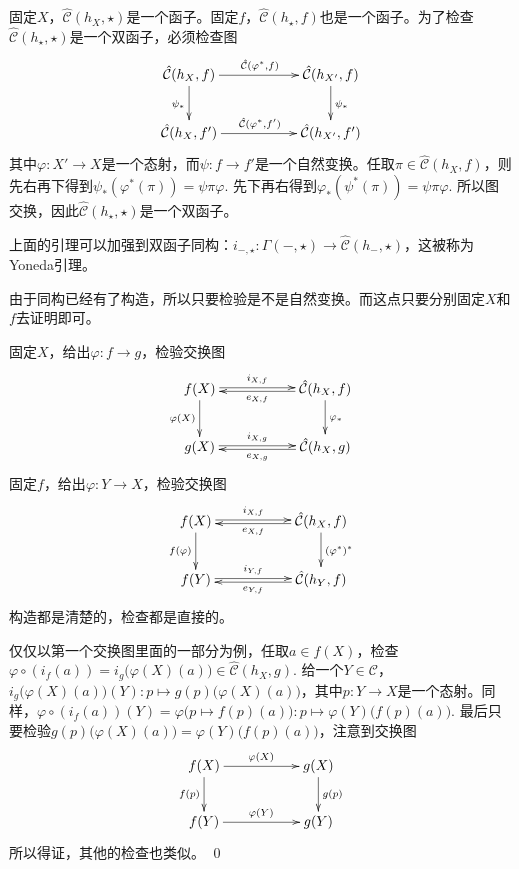 

\para 固定$X$，${\hat{\mathcal{C}}}(h_X,\star)$是一个函子。固定$f$，${\hat{\mathcal{C}}}(h_\star,f)$也是一个函子。为了检查${\hat{\mathcal{C}}}(h_\star,\star)$是一个双函子，必须检查图
\[
\begin{xy}
	\xymatrix{
		\hat{\mathcal{C}}(h_{X},f)\ar[rr]^{\hat{\mathcal{C}}(\varphi^*,f)} \ar[d]_{\psi_*}&&\hat{\mathcal{C}}(h_{X'},f) \ar[d]^{\psi_*}\\
		\hat{\mathcal{C}}(h_{X},f')\ar[rr]^{\hat{\mathcal{C}}(\varphi^*,f')}&&\hat{\mathcal{C}}(h_{X'},f')
	}
\end{xy}
\]
其中$\varphi:X'\to X$是一个态射，而$\psi:f\to f'$是一个自然变换。任取$\pi\in \hat{\mathcal{C}}(h_{X},f)$，则先右再下得到$\psi_*(\varphi^*(\pi))=\psi\pi\varphi$. 先下再右得到$\varphi_*(\psi^*(\pi))=\psi\pi\varphi$. 所以图交换，因此${\hat{\mathcal{C}}}(h_\star,\star)$是一个双函子。

\pro 上面的引理可以加强到双函子同构：$i_{-,\star}:\Gamma(-,\star)\to {\hat{\mathcal{C}}}(h_-,\star)$，这被称为Yoneda引理。

\proof
	由于同构已经有了构造，所以只要检验是不是自然变换。而这点只要分别固定$X$和$f$去证明即可。

	固定$X$，给出$\varphi:f\to g$，检验交换图
	\[
	\begin{xy}
		\xymatrix{
			f(X)\ar@<0.3ex>[rr]^-{i_{X,f}} \ar[d]_{\varphi(X)}&&{\hat{\mathcal{C}}}(h_X,f) \ar[d]^{\varphi_*}\ar@<0.3ex>[ll]^-{e_{X,f}}\\
			g(X)\ar@<0.3ex>[rr]^-{i_{X,g}}&&{\hat{\mathcal{C}}}(h_X,g)\ar@<0.3ex>[ll]^-{e_{X,g}}
		}
	\end{xy}
	\]
	固定$f$，给出$\varphi:Y\to X$，检验交换图
	\[
	\begin{xy}
		\xymatrix{
			f(X)\ar@<0.3ex>[rr]^-{i_{X,f}} \ar[d]_{f(\varphi)}&&{\hat{\mathcal{C}}}(h_X,f) \ar[d]^{(\varphi^*)^*}\ar@<0.3ex>[ll]^-{e_{X,f}}\\
			f(Y)\ar@<0.3ex>[rr]^-{i_{Y,f}}&&{\hat{\mathcal{C}}}(h_Y,f)\ar@<0.3ex>[ll]^-{e_{Y,f}}
		}
	\end{xy}
	\]
	构造都是清楚的，检查都是直接的。
	
	仅仅以第一个交换图里面的一部分为例，任取$a\in f(X)$，检查$\varphi\circ (i_f(a))=i_g\bigl(\varphi(X)(a)\bigr)\in {\hat{\mathcal{C}}}(h_X,g)$. 给一个$Y\in \mathcal{C}$，$i_g\bigl(\varphi(X)(a)\bigr)(Y):p\mapsto g(p)\bigl (\varphi(X)(a)\bigr)$，其中$p:Y\to X$是一个态射。同样，$\varphi\circ (i_f(a))(Y)=\varphi\bigl(p\mapsto f(p)(a)\bigr):p\mapsto \varphi(Y)\bigl(f(p)(a)\bigr)$. 最后只要检验$g(p)\bigl (\varphi(X)(a)\bigr)=\varphi(Y)\bigl(f(p)(a)\bigr)$，注意到交换图
	\[
	\begin{xy}
		\xymatrix{
			f(X)\ar[rr]^{\varphi(X)} \ar[d]_{f(p)}&&g(X) \ar[d]^{g(p)}\\
			f(Y)\ar[rr]^{\varphi(Y)}&&g(Y)
		}
	\end{xy}
	\]
	所以得证，其他的检查也类似。
\qed 

